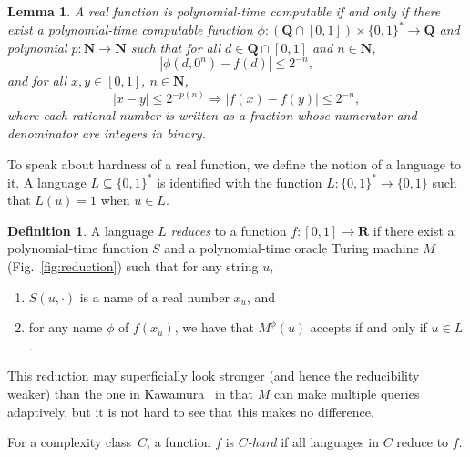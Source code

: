 \documentclass{lmcs}
\newtheorem{lemma}[theorem]{Lemma}
\theoremstyle{definition}
\newtheorem{definition}[theorem]{Definition}
\theoremstyle{remark}
\newcommand{\R}{\mathbf R}
\newcommand{\N}{\mathbf N}
\newcommand{\Q}{\mathbf Q}
\begin{document}
\begin{lemma}
 \label{lem:type1representation}
 A real function is polynomial-time computable if and only if
 there exist a polynomial-time computable function 
 $\phi \colon (\Q \cap [0, 1]) \times \{0, 1\} ^* \to \Q$ and 
 polynomial $p \colon \N \to \N$ such that
 for all $d \in \Q \cap [0,1]$ and $n \in \N$,
 \begin{equation}
  |\phi(d, 0^n) - f(d)| \le 2^{-n},
 \end{equation}
 and for all $x, y \in [0, 1]$, $n \in \N$,
 \begin{equation} 
  |x-y| \le 2^{-p(n)} \Rightarrow |f(x) - f(y)| \le 2^{-n},
   \label{eq:modulus}
 \end{equation}
where each rational number is written
as a fraction whose numerator and denominator
are integers in binary.
\end{lemma}

To speak about hardness of a real function, 
we define the notion of a language to it. 
A language $L \subseteq \{0, 1\} ^*$ is identified with the function 
$L \colon \{0, 1\} ^* \to \{0, 1\}$ such that $L (u) = 1$ when $u \in L$.

\begin{definition} \label{definition: reduction}
 A language $L$ \emph{reduces} to a function $f \colon [0, 1] \to \R$
 if there exist a polynomial-time function $S$ and 
 a polynomial-time oracle Turing machine $M$ (Fig.~\ref{fig:reduction})
 such that for any string $u$, 
  \begin{enumerate}
   \item $S (u, \cdot)$ is a name of a real number $x _u$, and 
   \item for any name $\phi$ of $f (x _u)$, we have that 
    $M ^\phi (u)$ accepts if and only if $u \in L$.
  \end{enumerate}
\end{definition}
This reduction may superficially look stronger (and hence the reducibility weaker) than
the one in Kawamura~\cite{kawamura2010lipschitz} 
in that $M$ can make multiple queries adaptively, 
but it is not hard to see that this makes no difference. 

For a complexity class~$C$, a function $f$ is \emph{$C$-hard}
if all languages in $C$ reduce to $f$.
\end{document}
